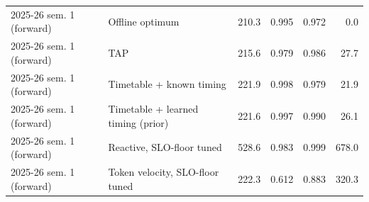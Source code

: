 \begin{tabular}{@{}llrrrr@{}}
2025-26 sem. 1 (forward) & Offline optimum & 210.3 & 0.995 & 0.972 & 0.0 \\
2025-26 sem. 1 (forward) & TAP & 215.6 & 0.979 & 0.986 & 27.7 \\
2025-26 sem. 1 (forward) & Timetable + known timing & 221.9 & 0.998 & 0.979 & 21.9 \\
2025-26 sem. 1 (forward) & Timetable + learned timing (prior) & 221.6 & 0.997 & 0.990 & 26.1 \\
2025-26 sem. 1 (forward) & Reactive, SLO-floor tuned & 528.6 & 0.983 & 0.999 & 678.0 \\
2025-26 sem. 1 (forward) & Token velocity, SLO-floor tuned & 222.3 & 0.612 & 0.883 & 320.3 \\
\bottomrule
\end{tabular}

